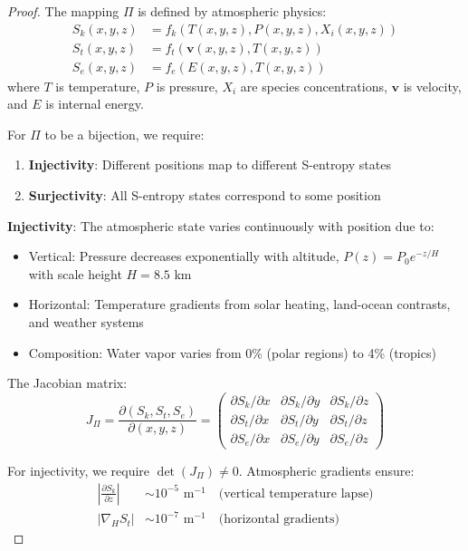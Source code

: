 \documentclass[twocolumn,10pt,a4paper]{article}
\theoremstyle{definition}
\theoremstyle{remark}
\begin{document}
\begin{proof}
The mapping $\Pi$ is defined by atmospheric physics:
\begin{align}
    S_k(x,y,z) &= f_k(T(x,y,z), P(x,y,z), X_i(x,y,z)) \\
    S_t(x,y,z) &= f_t(\mathbf{v}(x,y,z), T(x,y,z)) \\
    S_e(x,y,z) &= f_e(E(x,y,z), T(x,y,z))
\end{align}
where $T$ is temperature, $P$ is pressure, $X_i$ are species concentrations, $\mathbf{v}$ is velocity, and $E$ is internal energy.

For $\Pi$ to be a bijection, we require:
\begin{enumerate}
    \item \textbf{Injectivity}: Different positions map to different S-entropy states
    \item \textbf{Surjectivity}: All S-entropy states correspond to some position
\end{enumerate}

\textbf{Injectivity}: The atmospheric state varies continuously with position due to:
\begin{itemize}
    \item Vertical: Pressure decreases exponentially with altitude, $P(z) = P_0 e^{-z/H}$ with scale height $H = 8.5$ km
    \item Horizontal: Temperature gradients from solar heating, land-ocean contrasts, and weather systems
    \item Composition: Water vapor varies from 0\% (polar regions) to 4\% (tropics)
\end{itemize}

The Jacobian matrix:
\begin{equation}
    J_\Pi = \frac{\partial(S_k, S_t, S_e)}{\partial(x, y, z)} = \begin{pmatrix}
        \partial S_k/\partial x & \partial S_k/\partial y & \partial S_k/\partial z \\
        \partial S_t/\partial x & \partial S_t/\partial y & \partial S_t/\partial z \\
        \partial S_e/\partial x & \partial S_e/\partial y & \partial S_e/\partial z
    \end{pmatrix}
\end{equation}

For injectivity, we require $\det(J_\Pi) \neq 0$. Atmospheric gradients ensure:
\begin{align}
    \left|\frac{\partial S_k}{\partial z}\right| &\sim 10^{-5} \text{ m}^{-1} \quad \text{(vertical temperature lapse)} \\
    \left|\nabla_H S_t\right| &\sim 10^{-7} \text{ m}^{-1} \quad \text{(horizontal gradients)}
\end{align}


\end{proof}
\end{document}
